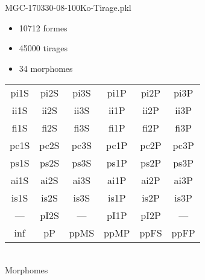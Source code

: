 MGC-170330-08-100Ko-Tirage.pkl
\begin{itemize}
\item 10712 formes
\item 45000 tirages
\item 34 morphomes
\end{itemize}
\begin{center}
\begin{tabular}{cccccc}
\hline
\cellcolor{white}pi1S & \cellcolor{orange}pi2S & \cellcolor{orange}pi3S & \cellcolor{white}pi1P & \cellcolor{white}pi2P & \cellcolor{white}pi3P\\
\cellcolor{brown}ii1S & \cellcolor{brown}ii2S & \cellcolor{brown}ii3S & \cellcolor{white}ii1P & \cellcolor{white}ii2P & \cellcolor{brown}ii3P\\
\cellcolor{yellow}fi1S & \cellcolor{lime}fi2S & \cellcolor{lime}fi3S & \cellcolor{green}fi1P & \cellcolor{white}fi2P & \cellcolor{green}fi3P\\
\cellcolor{yellow}pc1S & \cellcolor{yellow}pc2S & \cellcolor{yellow}pc3S & \cellcolor{white}pc1P & \cellcolor{white}pc2P & \cellcolor{yellow}pc3P\\
\cellcolor{white}ps1S & \cellcolor{teal}ps2S & \cellcolor{teal}ps3S & \cellcolor{white}ps1P & \cellcolor{white}ps2P & \cellcolor{teal}ps3P\\
\cellcolor{white}ai1S & \cellcolor{lightgray}ai2S & \cellcolor{lightgray}ai3S & \cellcolor{white}ai1P & \cellcolor{blue}ai2P & \cellcolor{white}ai3P\\
\cellcolor{black}is1S & \cellcolor{white}is2S & \cellcolor{lightgray}is3S & \cellcolor{white}is1P & \cellcolor{black}is2P & \cellcolor{white}is3P\\
--- & \cellcolor{white}pI2S & --- & \cellcolor{white}pI1P & \cellcolor{blue}pI2P & ---\\
\cellcolor{white}inf & \cellcolor{white}pP & \cellcolor{white}ppMS & \cellcolor{white}ppMP & \cellcolor{white}ppFS & \cellcolor{white}ppFP\\
\hline
\end{tabular}\\
Morphomes
\end{center}
\bigskip

